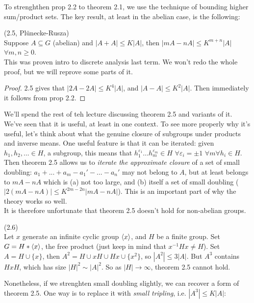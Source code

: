 \documentclass[a4paper]{article}
\begin{document}
To strenghthen prop 2.2 to theorem 2.1, we use the technique of bounding higher sum/product sets. The key result, at least in the abelian case, is the following:

\begin{thm} (2.5, Pl\"{u}necke-Rusza)\\
    Suppose $A \subseteq G$ (abelian) and $|A+A| \leq K|A|$, then $|mA-nA| \leq K^{m+n} |A|$ $\forall m,n \geq 0$.\\
    This was proven intro to discrete analysis last term. We won't redo the whole proof, but we will reprove some parts of it.
\end{thm}

\begin{proof}
    2.5 gives that $|2A-2A| \leq K^4 |A|$, and $|A-A| \leq K^2|A|$. Then immediately it follows from prop 2.2.
\end{proof}

We'll spend the rest of teh lecture discussing theorem 2.5 and variants of it. We've seen that it is useful, at least in one context. To see more properly why it's useful, let's think about what the genuine closure of subgroups under products and inverse means. One useful feature is that it can be iterated: given $h_1,h_2,... \in H$, a subgroup, this means that $h_1^{\varepsilon_1}...h_m^{\varepsilon_m} \in H$ $\forall \varepsilon_i = \pm 1$ $\forall m \forall h_i \in H$. Then theorem 2.5 allows us to \emph{iterate the approximate closure} of a set of small doubling: $a_1+...+a_m-a_1'-...-a_n'$ may not belong to $A$, but at least belongs to $mA-nA$ which is (a) not too large, and (b) itself a set of small doubling ($|2(mA-nA)| \leq K^{2m-2n} |mA-nA|$). This is an important part of why the theory works so well.\\
It is therefore unfortunate that theorem 2.5 doesn't hold for non-abelian groups.

\begin{eg} (2.6)\\
    Let $x$ generate an infinite cyclic group $\langle x \rangle$, and $H$ be a finite group. Set $G=H *\langle x\rangle$, the free product (just keep in mind that $x^{-1} Hx \neq H$). Set $A = H \cup \{x\}$, then $A^2 = H \cup xH \cup Hx \cup \{x^2\}$, so $|A^2| \leq 3|A|$. But $A^3$ contains $HxH$, which has size $|H|^2 \sim |A|^2$. So as $|H| \to \infty$, theorem 2.5 cannot hold.
\end{eg}

Nonetheless, if we strenghten small doubling slightly, we can recover a form of theorem 2.5. One way is to replace it with \emph{small tripling}, i.e. $|A^3| \leq K|A|$:
\end{document}

